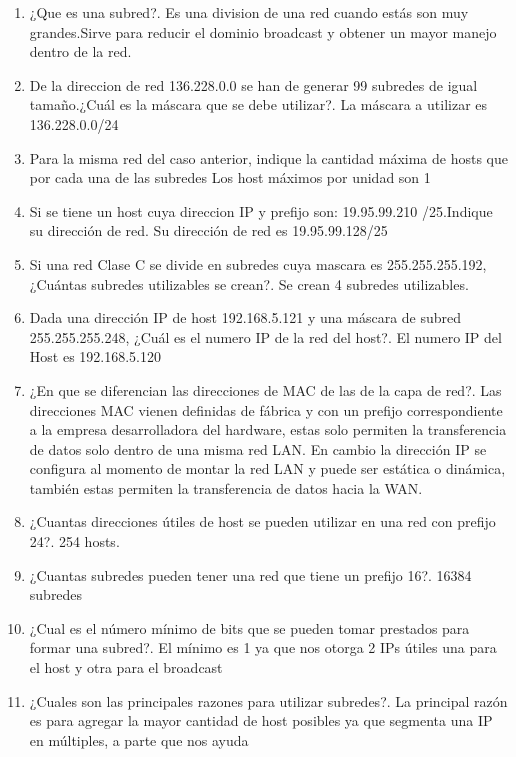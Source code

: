 \documentclass{udparticle}
\begin{document}
\begin{enumerate}
\item ¿Que es una subred?.
Es una division de una red cuando estás son muy grandes.Sirve para reducir el dominio broadcast y obtener un mayor manejo dentro
de la red.
\item De la direccion de red 136.228.0.0 se han de generar 99 subredes de igual tamaño.¿Cuál es la máscara que se debe utilizar?.
La máscara a utilizar es 136.228.0.0/24\\
\item Para la misma red del caso anterior, indique la cantidad máxima de hosts que por cada una de las subredes
Los host máximos por unidad son 1\\
\item Si se tiene un host cuya direccion IP y prefijo son: 19.95.99.210 
/25.Indique su dirección de red.
Su dirección de red es 19.95.99.128/25\\
\item Si una red Clase C se divide en subredes cuya mascara es 255.255.255.192, ¿Cuántas subredes utilizables se crean?.
Se crean 4 subredes utilizables.\\
\item Dada una dirección IP de host 192.168.5.121 y una máscara de 
subred 255.255.255.248, ¿Cuál es el numero IP de la red del host?.
El numero IP del Host es 192.168.5.120\\
\item ¿En que se diferencian las direcciones de MAC de las de la capa de red?.
Las direcciones MAC vienen definidas de fábrica y con un prefijo correspondiente a la empresa desarrolladora del hardware, estas solo permiten la transferencia de datos solo dentro de una misma red LAN. En cambio la dirección IP se configura al momento de montar la red LAN y puede ser estática o dinámica, también estas permiten la transferencia de datos hacia la WAN.
\item ¿Cuantas direcciones útiles de host se pueden utilizar en una red con prefijo 24?.
	254 hosts.
\item ¿Cuantas subredes pueden tener una red que tiene un prefijo 16?.
 	16384 subredes
\item ¿Cual es el número mínimo de bits que se pueden tomar prestados para formar una subred?.
El mínimo es 1 ya que nos otorga 2 IPs útiles una para el host y otra para el broadcast
\item ¿Cuales son las principales razones para utilizar subredes?.
La principal razón es para agregar la mayor cantidad de host posibles ya que segmenta una IP en múltiples, a parte que nos ayuda

\end{enumerate}
\end{document}
